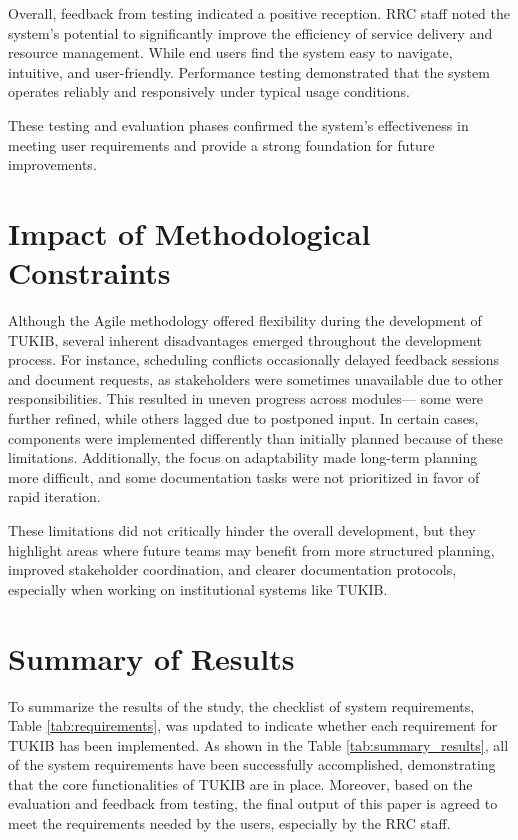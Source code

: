 Overall, feedback from testing indicated a positive reception. RRC staff noted the system’s potential to significantly improve the efficiency of service delivery and resource management. While end users find the system easy to navigate, intuitive, and user-friendly. Performance testing demonstrated that the system operates reliably and responsively under typical usage conditions.

These testing and evaluation phases confirmed the system’s effectiveness in meeting user requirements and provide a strong foundation for future improvements.

\section{Impact of Methodological Constraints}

Although the Agile methodology offered flexibility during the development of TUKIB, several inherent disadvantages emerged throughout the development process. For instance, scheduling conflicts occasionally delayed feedback sessions and document requests, as stakeholders were sometimes unavailable due to other responsibilities. This resulted in uneven progress across modules— some were further refined, while others lagged due to postponed input. In certain cases, components were implemented differently than initially planned because of these limitations. Additionally, the focus on adaptability made long-term planning more difficult, and some documentation tasks were not prioritized in favor of rapid iteration.

These limitations did not critically hinder the overall development, but they highlight areas where future teams may benefit from more structured planning, improved stakeholder coordination, and clearer documentation protocols, especially when working on institutional systems like TUKIB.

\section{Summary of Results}

To summarize the results of the study, the checklist of system requirements, Table \ref{tab:requirements}, was updated to indicate whether each requirement for TUKIB has been implemented. As shown in the Table \ref{tab:summary_results}, all of the system requirements have been successfully accomplished, demonstrating that the core functionalities of TUKIB are in place. Moreover, based on the evaluation and feedback from testing, the final output of this paper is agreed to meet the requirements needed by the users, especially by the RRC staff.

